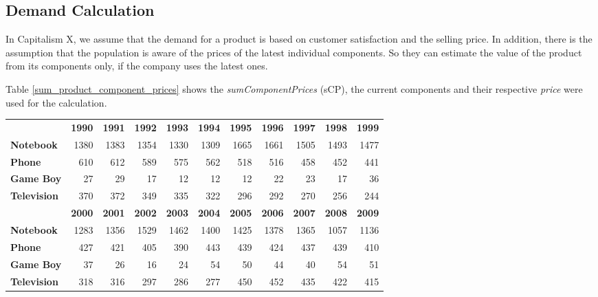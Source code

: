\subsection{Demand Calculation} \label{demandCalc}

In Capitalism X, we assume that the demand for a product is based on customer satisfaction and the selling price. In addition, there is the assumption that the population is aware of the prices of the latest individual components. So they can estimate the value of the product from its components only, if the company uses the latest ones.
 
Table \ref{sum_product_component_prices} shows the \textit{sumComponentPrices} (\gls{sCP}), the current components and their respective \textit{price} were used for the calculation.

\begin{table}[ht]
    \centering
    \begin{tabular}{|l|r|r|r|r|r|r|r|r|r|r|}
    \hline
                & \textbf{1990} & \textbf{1991}  & \textbf{1992}  & \textbf{1993}  & \textbf{1994}  & \textbf{1995}  & \textbf{1996}  & \textbf{1997}  & \textbf{1998}  & \textbf{1999}  \\
    \textbf{Notebook}    & 1380  & 1383  & 1354  & 1330  & 1309  & 1665  & 1661  & 1505  & 1493  & 1477  \\   
    \textbf{Phone}       & 610   & 612   & 589   & 575   & 562   & 518   & 516   & 458   & 452   & 441   \\ 
    \textbf{Game Boy}    & 27    & 29    & 17    & 12    & 12    & 12    & 22    & 23    & 17    & 36    \\  
    \textbf{Television}  & 370   & 372   & 349   & 335   & 322   & 296   & 292   & 270   & 256   & 244    \\ 
    \hline       
                & \textbf{2000}  & \textbf{2001}  & \textbf{2002}  & \textbf{2003}  & \textbf{2004}  & \textbf{2005}  & \textbf{2006}  & \textbf{2007}  & \textbf{2008}  & \textbf{2009} \\
    \textbf{Notebook}    & 1283  & 1356  & 1529  & 1462  & 1400  & 1425  & 1378  & 1365  & 1057  & 1136 \\   
    \textbf{Phone}       & 427   & 421   & 405   & 390   & 443   & 439   & 424   & 437   & 439   & 410 \\  
    \textbf{Game Boy}    & 37    & 26    & 16    & 24    & 54    & 50    & 44    & 40    & 54    & 51  \\   
    \textbf{Television}  & 318   & 316   & 297   & 286   & 277   & 450   & 452   & 435   & 422   & 415 \\ 

\end{tabular}
\end{table}
